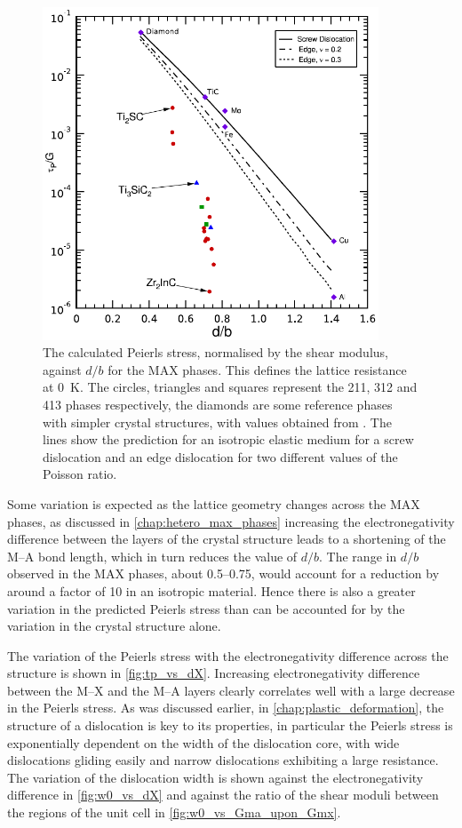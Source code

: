 \begin{figure}
\centering
\includegraphics[width=10cm]{tp_vs_d_upon_b}
\captionsetup{width=12cm}
\caption[The calculated Peierls stresses of the MAX phases as a function of lattice geometry.]{The calculated Peierls stress, normalised by the shear modulus, against $d/b$ for the MAX phases. This defines the lattice resistance at \SI{0}{\kelvin}. The circles, triangles and squares represent the 211, 312 and 413 phases respectively, the diamonds are some reference phases with simpler crystal structures, with values obtained from \cite{Clegg2006}. The lines show the prediction for an isotropic elastic medium for a screw dislocation and an edge dislocation for two different values of the Poisson ratio. \label{fig:peierls_stress_vs_d_upon_b}}
\end{figure}


Some variation is expected as the lattice geometry changes across the MAX phases, as discussed in \autoref{chap:hetero_max_phases} increasing the electronegativity difference between the layers of the crystal structure leads to a shortening of the M--A bond length, which in turn reduces the value of $d/b$. The range in $d/b$ observed in the MAX phases, about \numrange{0.5}{0.75}, would account for a reduction by around a factor of \num{10} in an isotropic material. Hence there is also a greater variation in the predicted Peierls stress than can be accounted for by the variation in the crystal structure alone. 


The variation of the Peierls stress with the electronegativity difference across the structure is shown in \autoref{fig:tp_vs_dX}. Increasing electronegativity difference between the M--X and the M--A layers clearly correlates well with a large decrease in the Peierls stress. As was discussed earlier, in \autoref{chap:plastic_deformation}, the structure of a dislocation is key to its properties, in particular the Peierls stress is exponentially dependent on the width of the dislocation core, with wide dislocations gliding easily and narrow dislocations exhibiting a large resistance. The variation of the dislocation width is shown against the electronegativity difference in \autoref{fig:w0_vs_dX} and against the ratio of the shear moduli between the regions of the unit cell in \autoref{fig:w0_vs_Gma_upon_Gmx}.




